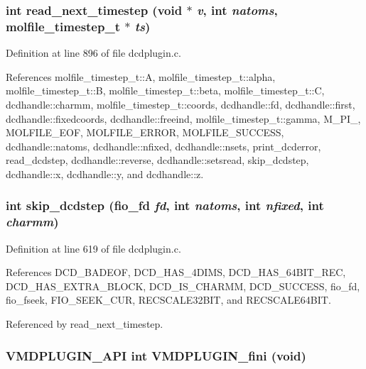 \subsubsection{\setlength{\rightskip}{0pt plus 5cm}int read\_\-next\_\-timestep (void $\ast$ {\em v}, int {\em natoms}, {\bf molfile\_\-timestep\_\-t} $\ast$ {\em ts})\hspace{0.3cm}{\tt  [static]}}\label{dcdplugin_8c_a36}




Definition at line 896 of file dcdplugin.c.

References molfile\_\-timestep\_\-t::A, molfile\_\-timestep\_\-t::alpha, molfile\_\-timestep\_\-t::B, molfile\_\-timestep\_\-t::beta, molfile\_\-timestep\_\-t::C, dcdhandle::charmm, molfile\_\-timestep\_\-t::coords, dcdhandle::fd, dcdhandle::first, dcdhandle::fixedcoords, dcdhandle::freeind, molfile\_\-timestep\_\-t::gamma, M\_\-PI\_, MOLFILE\_\-EOF, MOLFILE\_\-ERROR, MOLFILE\_\-SUCCESS, dcdhandle::natoms, dcdhandle::nfixed, dcdhandle::nsets, print\_\-dcderror, read\_\-dcdstep, dcdhandle::reverse, dcdhandle::setsread, skip\_\-dcdstep, dcdhandle::x, dcdhandle::y, and dcdhandle::z.
\subsubsection{\setlength{\rightskip}{0pt plus 5cm}int skip\_\-dcdstep ({\bf fio\_\-fd} {\em fd}, int {\em natoms}, int {\em nfixed}, int {\em charmm})\hspace{0.3cm}{\tt  [static]}}\label{dcdplugin_8c_a31}




Definition at line 619 of file dcdplugin.c.

References DCD\_\-BADEOF, DCD\_\-HAS\_\-4DIMS, DCD\_\-HAS\_\-64BIT\_\-REC, DCD\_\-HAS\_\-EXTRA\_\-BLOCK, DCD\_\-IS\_\-CHARMM, DCD\_\-SUCCESS, fio\_\-fd, fio\_\-fseek, FIO\_\-SEEK\_\-CUR, RECSCALE32BIT, and RECSCALE64BIT.

Referenced by read\_\-next\_\-timestep.
\subsubsection{\setlength{\rightskip}{0pt plus 5cm}VMDPLUGIN\_\-API int VMDPLUGIN\_\-fini (void)}\label{dcdplugin_8c_a43}




